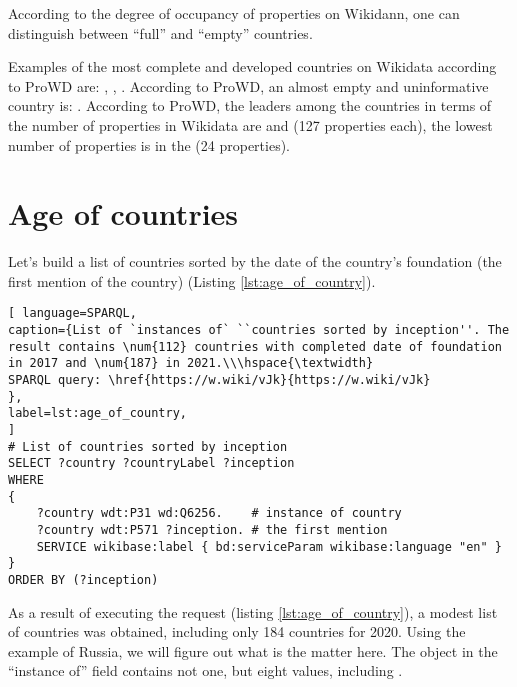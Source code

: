 According to the degree of occupancy of properties on Wikidann, one can distinguish between ``full'' and ``empty'' countries.

Examples of the most complete and developed countries on Wikidata according to ProWD are: , , . According to ProWD, an almost empty and uninformative country is: . According to ProWD, the leaders among the countries in terms of the number of properties in Wikidata are  and  (127 properties each), the lowest number of properties is in the   (24 properties).


\section{Age of countries}

Let's build a list of countries sorted by the date of the country's foundation (the first mention of the country) (Listing \ref{lst:age_of_country}).

\begin{lstlisting}[ language=SPARQL, 
caption={List of `instances of` ``countries sorted by inception''. The result contains \num{112} countries with completed date of foundation in 2017 and \num{187} in 2021.\\\hspace{\textwidth}
SPARQL query: \href{https://w.wiki/vJk}{https://w.wiki/vJk}
},
label=lst:age_of_country, 					
]
# List of countries sorted by inception 
SELECT ?country ?countryLabel ?inception
WHERE
{
	?country wdt:P31 wd:Q6256.    # instance of country
	?country wdt:P571 ?inception. # the first mention
	SERVICE wikibase:label { bd:serviceParam wikibase:language "en" }
}
ORDER BY (?inception)
\end{lstlisting}

As a result of executing the request (listing \ref{lst:age_of_country}), a modest list of countries was obtained, including only 184 countries for 2020. Using the example of Russia, we will figure out what is the matter here. The  object in the ``instance of'' field contains not one, but eight values, including .


